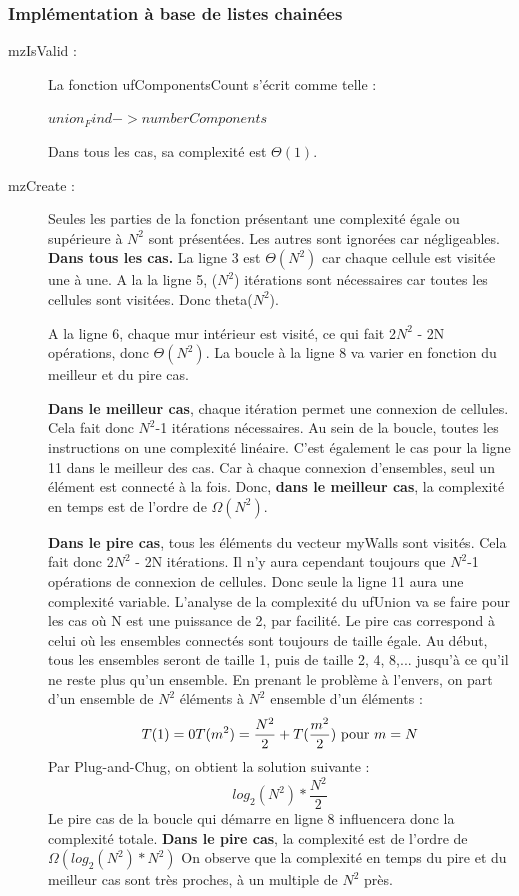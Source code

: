 \documentclass[10pt]{article}
\begin{document}
\subsubsection{Implémentation à base de listes chainées}
\begin{description}
\item[mzIsValid :]La fonction ufComponentsCount s'écrit comme telle :
\begin{codebox}
\li \Return $union_Find->numberComponents$
\end{codebox}
Dans tous les cas, sa complexité est $\Theta(1)$.



\item[mzCreate :] Seules les parties de la fonction présentant une complexité égale ou supérieure à $N^{2}$ sont présentées. Les autres sont ignorées car négligeables. \textbf{Dans tous les cas.} La ligne 3 est $\Theta(N^{2})$ car chaque cellule est visitée une à une. A la la ligne 5, ($N^{2}$) itérations sont nécessaires car toutes les cellules sont visitées. Donc theta($N^{2}$).

A la ligne 6, chaque mur intérieur est visité, ce qui fait 2$N^{2}$ - 2N opérations, donc $\Theta(N^{2})$.
La boucle à la ligne 8 va varier en fonction du meilleur et du pire cas. 

\textbf{Dans le meilleur cas}, chaque itération permet une connexion de cellules. Cela fait donc $N^{2}$-1 itérations nécessaires. Au sein de la boucle, toutes les instructions on une complexité linéaire. C'est également le cas pour la ligne 11 dans le meilleur des cas. Car à chaque connexion d'ensembles, seul un élément est connecté à la fois. Donc,\textbf{ dans le meilleur cas}, la complexité en temps est de l'ordre de $\Omega(N^{2})$. 

\textbf{Dans le pire cas}, tous les éléments du vecteur myWalls sont visités. Cela fait donc 2$N^{2}$ - 2N  itérations. Il n'y aura cependant toujours que $N^{2}$-1 opérations de connexion de cellules. Donc seule la ligne 11 aura une complexité variable. L'analyse de la complexité du ufUnion va se faire pour les cas où N est une puissance de 2, par facilité. Le pire cas correspond à celui où les ensembles connectés sont toujours de taille égale. Au début, tous les ensembles seront de taille 1, puis de taille 2, 4, 8,... jusqu'à ce qu'il ne reste plus qu'un ensemble. En prenant le problème à l'envers, on part d'un ensemble de $N^{2}$ éléments à $N^{2}$ ensemble d'un éléments :
\begin{equation}
	T(1) = 0
	T(m^{2}) = \frac{N^{2}}{2} + T(\frac{m^{2}}{2}) $ pour $ m = N
\end{equation}
Par Plug-and-Chug, on obtient la solution suivante :
\begin{equation}
	log_{2} (N^{2}) * \frac{N^{2}}{2}
\end{equation}
Le pire cas de la boucle qui démarre en ligne 8 influencera donc la complexité totale.
\textbf{Dans le pire cas}, la complexité est de l'ordre de $\Omega(log_{2} (N^{2})*N^{2})$
On observe que la complexité en temps du pire et du meilleur cas sont très proches, à un multiple de $N^{2}$ près.
\end{description}
\newpage 
\end{document}
